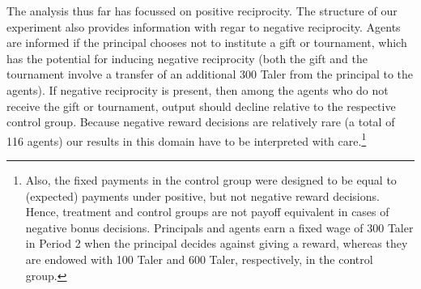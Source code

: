 

 The analysis thus far has focussed on positive reciprocity. The structure of our experiment 
also provides information with regar to negative reciprocity.
Agents are informed if the principal chooses not to institute a gift or tournament, which 
has the potential for inducing negative reciprocity (both the gift and the tournament involve 
a transfer of an additional 300 Taler from the principal to the agents).  
If negative reciprocity is present, then among the agents who do not receive the gift or 
tournament, output should decline relative to the respective control group.
Because negative reward decisions are relatively rare (a total of 116 agents) our results 
in this domain have to be interpreted with care.\footnote{Also, the fixed payments in the control group were designed to be equal to (expected) 
payments under positive, but not negative reward decisions. Hence, treatment 
and control groups are not payoff equivalent in cases of negative 
bonus decisions. Principals and agents earn a fixed wage of 300 Taler in Period 2 when the principal decides against giving a reward, whereas they 
are endowed with 100 Taler and 600 Taler, 
respectively, in the control group.}
 

